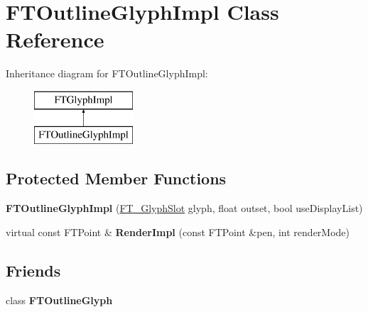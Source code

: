 \hypertarget{class_f_t_outline_glyph_impl}{}\section{F\+T\+Outline\+Glyph\+Impl Class Reference}
\label{class_f_t_outline_glyph_impl}
Inheritance diagram for F\+T\+Outline\+Glyph\+Impl\+:\begin{figure}[H]
\begin{center}
\leavevmode
\includegraphics[height=2.000000cm]{class_f_t_outline_glyph_impl}
\end{center}
\end{figure}
\subsection*{Protected Member Functions}
\begin{DoxyCompactItemize}
\item 
{\bfseries F\+T\+Outline\+Glyph\+Impl} (\hyperlink{struct_f_t___glyph_slot_rec__}{F\+T\+\_\+\+Glyph\+Slot} glyph, float outset, bool use\+Display\+List)\hypertarget{class_f_t_outline_glyph_impl_a0eac191ec3db6c8dbbf6956ded4342fa}{}\label{class_f_t_outline_glyph_impl_a0eac191ec3db6c8dbbf6956ded4342fa}

\item 
virtual const F\+T\+Point \& {\bfseries Render\+Impl} (const F\+T\+Point \&pen, int render\+Mode)\hypertarget{class_f_t_outline_glyph_impl_a554ed38dfe9a113804394c35e9ef9d35}{}\label{class_f_t_outline_glyph_impl_a554ed38dfe9a113804394c35e9ef9d35}

\end{DoxyCompactItemize}
\subsection*{Friends}
\begin{DoxyCompactItemize}
\item 
class {\bfseries F\+T\+Outline\+Glyph}\hypertarget{class_f_t_outline_glyph_impl_accb6ff0274a52a67e706edda49d6a201}{}\label{class_f_t_outline_glyph_impl_accb6ff0274a52a67e706edda49d6a201}

\end{DoxyCompactItemize}
